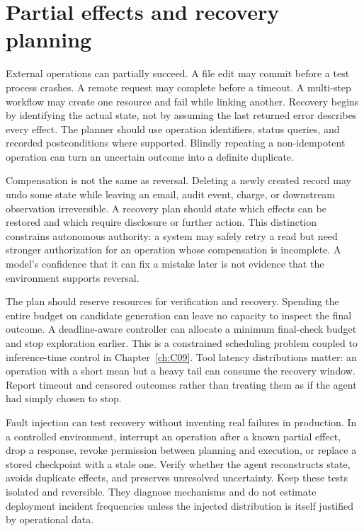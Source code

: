 \section{Partial effects and recovery planning}
\label{sec:C10:recovery}
External operations can partially succeed. A file edit may commit before a test process crashes. A remote request may complete before a timeout. A multi-step workflow may create one resource and fail while linking another. Recovery begins by identifying the actual state, not by assuming the last returned error describes every effect. The planner should use operation identifiers, status queries, and recorded postconditions where supported. Blindly repeating a non-idempotent operation can turn an uncertain outcome into a definite duplicate.

Compensation is not the same as reversal. Deleting a newly created record may undo some state while leaving an email, audit event, charge, or downstream observation irreversible. A recovery plan should state which effects can be restored and which require disclosure or further action. This distinction constrains autonomous authority: a system may safely retry a read but need stronger authorization for an operation whose compensation is incomplete. A model's confidence that it can fix a mistake later is not evidence that the environment supports reversal.

The plan should reserve resources for verification and recovery. Spending the entire budget on candidate generation can leave no capacity to inspect the final outcome. A deadline-aware controller can allocate a minimum final-check budget and stop exploration earlier. This is a constrained scheduling problem coupled to inference-time control in Chapter~\ref{ch:C09}. Tool latency distributions matter: an operation with a short mean but a heavy tail can consume the recovery window. Report timeout and censored outcomes rather than treating them as if the agent had simply chosen to stop.

Fault injection can test recovery without inventing real failures in production. In a controlled environment, interrupt an operation after a known partial effect, drop a response, revoke permission between planning and execution, or replace a stored checkpoint with a stale one. Verify whether the agent reconstructs state, avoids duplicate effects, and preserves unresolved uncertainty. Keep these tests isolated and reversible. They diagnose mechanisms and do not estimate deployment incident frequencies unless the injected distribution is itself justified by operational data.

